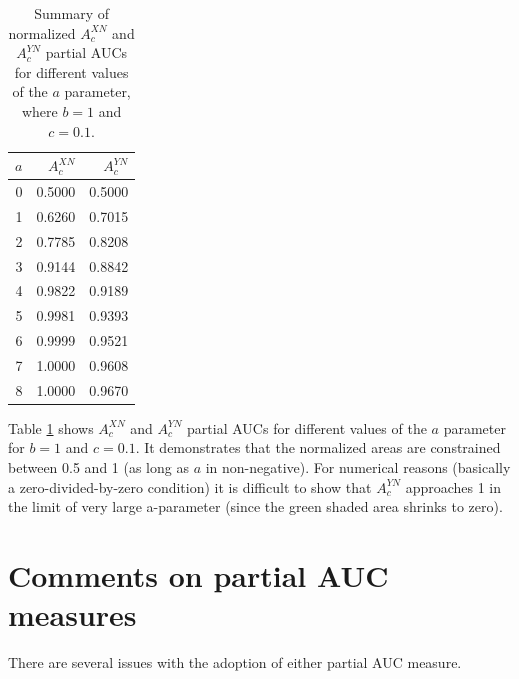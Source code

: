 \documentclass[
]{book}
\begin{document}
\begin{table}

\caption{\label{tab:summary-table-partial-normalized-areas}Summary of normalized $A_c^{XN}$ and $A_c^{YN}$ partial AUCs for different values of the $a$ parameter, where $b = 1$ and $c = 0.1$.}
\centering
\begin{tabular}[t]{r|r|r}
\hline
$a$ & $A^{XN}_c$ & $A^{YN}_c$\\
\hline
0 & 0.5000 & 0.5000\\
\hline
1 & 0.6260 & 0.7015\\
\hline
2 & 0.7785 & 0.8208\\
\hline
3 & 0.9144 & 0.8842\\
\hline
4 & 0.9822 & 0.9189\\
\hline
5 & 0.9981 & 0.9393\\
\hline
6 & 0.9999 & 0.9521\\
\hline
7 & 1.0000 & 0.9608\\
\hline
8 & 1.0000 & 0.9670\\
\hline
\end{tabular}
\end{table}

Table \ref{tab:summary-table-partial-normalized-areas} shows \(A_c^{XN}\) and \(A_c^{YN}\) partial AUCs for different values of the \(a\) parameter for \(b = 1\) and \(c = 0.1\). It demonstrates that the normalized areas are constrained between 0.5 and 1 (as long as \(a\) in non-negative). For numerical reasons (basically a zero-divided-by-zero condition) it is difficult to show that \(A_c^{YN}\) approaches 1 in the limit of very large a-parameter (since the green shaded area shrinks to zero).

\hypertarget{binormal-model-partial-auc-comments}{%
\section{Comments on partial AUC measures}\label{binormal-model-partial-auc-comments}}

There are several issues with the adoption of either partial AUC measure.
\end{document}
